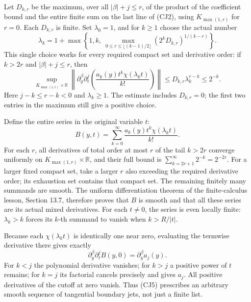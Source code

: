 \documentclass[
  11pt,
]{article}
\begin{document}
Let \(D_{k,r}\) be the maximum, over all \(|\beta|+j\leq r\), of the
product of the coefficient bound and the entire finite sum on the last
line of (CJ2), using \(K_{\max(1,r)}\) for \(r=0\). Each \(D_{k,r}\) is
finite. Set \(\lambda_0=1\), and for \(k\geq1\) choose the actual number
\[
 \lambda_k=
 1+\max\left\{1,k,\
       \max_{0\leq r\leq\lfloor(k-1)/2\rfloor}
                (2^kD_{k,r})^{1/(k-r)}\right\}.
 \tag{CJ3}
\] This single choice works for every required compact set and
derivative order: if \(k>2r\) and \(|\beta|+j\leq r\), then \[
 \sup_{K_{\max(1,r)}\times\mathbb R}
 \left\|\partial_y^\beta\partial_t^j
       \left(\frac{a_k(y)t^k\chi(\lambda_kt)}{k!}\right)\right\|
 \leq D_{k,r}\lambda_k^{r-k}\leq2^{-k}.
 \tag{CJ4}
\] Here \(j-k\leq r-k<0\) and \(\lambda_k\geq1\). The estimate includes
\(D_{k,r}=0\); the first two entries in the maximum still give a
positive choice.

Define the entire series in the original variable \(t\): \[
 B(y,t)=\sum_{k=0}^{\infty}
               \frac{a_k(y)t^k\chi(\lambda_kt)}{k!}.
 \tag{CJ5}
\] For each \(r\), all derivatives of total order at most \(r\) of the
tail \(k>2r\) converge uniformly on \(K_{\max(1,r)}\times\mathbb R\),
and their full bound is \(\sum_{k=2r+1}^{\infty}2^{-k}=2^{-2r}\). For a
larger fixed compact set, take a larger \(r\) also exceeding the
required derivative order; its exhaustion set contains that compact set.
The remaining finitely many summands are smooth. The uniform
differentiation theorem of the finite-calculus lesson, Section 13.7,
therefore proves that \(B\) is smooth and that all these series are its
actual mixed derivatives. For each \(t\ne0\), the series is even locally
finite: \(\lambda_k>k\) forces its \(k\)-th summand to vanish when
\(k>R/|t|\).

Because each \(\chi(\lambda_kt)\) is identically one near zero,
evaluating the termwise derivative there gives exactly \[
 \partial_y^\beta\partial_t^j B(y,0)
       =\partial_y^\beta a_j(y).
 \tag{CJ6}
\] For \(k<j\) the polynomial derivative vanishes; for \(k>j\) a
positive power of \(t\) remains; for \(k=j\) its factorial cancels
precisely and gives \(a_j\). All positive derivatives of the cutoff at
zero vanish. Thus (CJ5) prescribes an arbitrary smooth sequence of
tangential boundary jets, not just a finite list.
\end{document}
